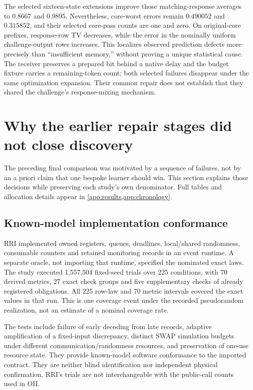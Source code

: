 
The selected sixteen-state extensions improve those matching-response averages to $0.8667$ and $0.9895$. Nevertheless, core-worst errors remain $0.490052$ and $0.315852$, and their selected core-pass counts are one and zero. On original-core prefixes, response-row TV decreases, while the error in the nominally uniform challenge-output rows increases. This localizes observed prediction defects more precisely than ``insufficient memory,'' without proving a unique statistical cause. The receiver preserves a prepared bit behind a native delay and the budget fixture carries a remaining-token count; both selected failures disappear under the same optimization expansion. Their common repair does not establish that they shared the challenge's response-mixing mechanism.



\section{Why the earlier repair stages did not close discovery}\label{sec:development}
The preceding final comparison was motivated by a sequence of failures, not by an a priori claim that one bespoke learner should win. This section explains those decisions while preserving each study's own denominator. Full tables and allocation details appear in \cref{app:results,app:chronology}.

\subsection{Known-model implementation conformance}\label{p3:c02}
RRI implemented owned registers, queues, deadlines, local/shared randomness, consumable counters and retained monitoring records in an event runtime. A separate oracle, not importing that runtime, specified the nominated exact laws. The study executed 1,557,504 fixed-seed trials over 225 conditions, with 70 derived metrics, 27 exact check groups and five supplementary checks of already registered obligations. All 225 row-law and 70 metric intervals covered the exact values in that run. This is one coverage event under the recorded pseudorandom realization, not an estimate of a nominal coverage rate.

The tests include failure of early decoding from late records, adaptive amplification of a fixed-input discrepancy, distinct SWAP simulation budgets under different communication/randomness resources, and preservation of one-use resource state. They provide known-model software conformance to the imported contract. They are neither blind identification nor independent physical confirmation. RRI's trials are not interchangeable with the public-call counts used in OII.


